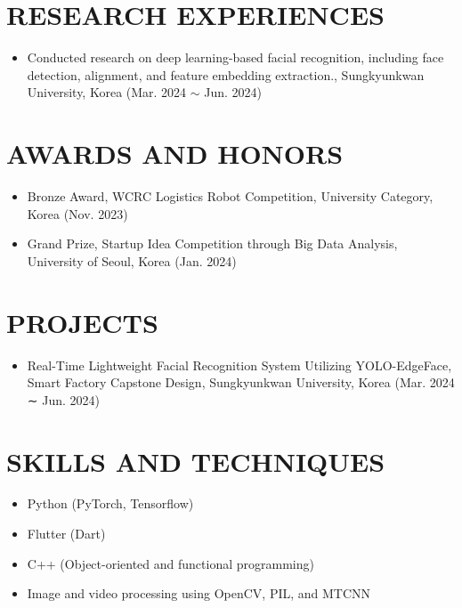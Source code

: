 \documentclass[11pt,a4paper]{article}
\begin{document}
\section{{\color{sungkyungreen}RES}EARCH EXPERIENCES}
\begin{itemize}[leftmargin=*]
    \item Conducted research on deep learning-based facial recognition, including face detection, alignment, and feature embedding extraction., Sungkyunkwan University, Korea (Mar. 2024 $\sim$ Jun. 2024)
\end{itemize}



\section{{\color{sungkyungreen}AWA}RDS AND HONORS}
\begin{itemize}[leftmargin=*]
    \item Bronze Award, WCRC Logistics Robot Competition, University Category, Korea (Nov. 2023)
    \item Grand Prize, Startup Idea Competition through Big Data Analysis, University of Seoul, Korea (Jan. 2024)
\end{itemize}

\section{{\color{sungkyungreen}PRO}JECTS}
\begin{itemize}[leftmargin=*]
    \item Real-Time Lightweight Facial Recognition System Utilizing YOLO-EdgeFace, Smart Factory Capstone Design, Sungkyunkwan University, Korea (Mar. 2024 ∼ Jun. 2024)
\end{itemize}

\section{{\color{sungkyungreen}SKI}LLS AND TECHNIQUES}
\begin{itemize}[leftmargin=*]
    \item Python (PyTorch, Tensorflow)
    \item Flutter (Dart) 
    \item C++ (Object-oriented and functional programming)
    \item Image and video processing using OpenCV, PIL, and MTCNN
\end{itemize}
\end{document}

